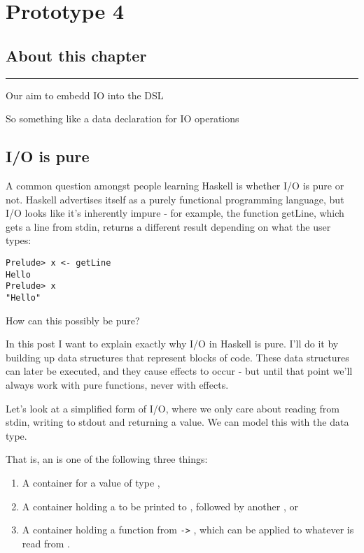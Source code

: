 \documentclass[thesis-solanki.tex]{subfiles}
\begin{document}
\chapter{Prototype 4}{\label{proto4}}


\section{About this chapter}

\noindent\rule{\textwidth}{0.5pt}

Our aim to embedd IO into the DSL

So something like a data declaration for IO operations

\section{I/O is pure}

\cite{website:ioispurechristaylor}

A common question amongst people learning Haskell is whether I/O is pure or not. Haskell advertises itself as a purely functional 
programming language, but I/O looks like it's inherently impure - for example, the function getLine, which gets a line from stdin, returns 
a different result depending on what the user types:

\begin{verbatim}
Prelude> x <- getLine
Hello
Prelude> x
"Hello"
\end{verbatim}

How can this possibly be pure?

In this post I want to explain exactly why I/O in Haskell is pure. I'll do it by building up data structures that represent blocks of code. 
These data structures can later be executed, and they cause effects to occur - but until that point we'll always work with pure functions, 
never with effects.

Let's look at a simplified form of I/O, where we only care about reading from stdin, writing to stdout and returning a value. We can model 
this with the  data type.

That is, an  is one of the following three things:
\begin{enumerate}
\item A container for a value of type ,

\item A container holding a  to be printed to ,
  followed by another , or

\item A container holding a function from  \Verb!->! , which can be applied
  to whatever  is read from . 
\end{enumerate}
\end{document}
